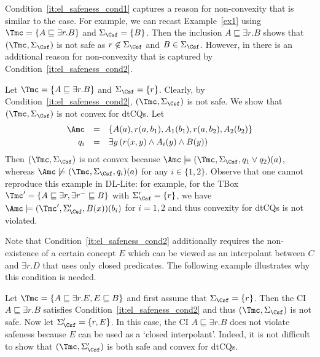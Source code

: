 \documentclass{lmcs}
\theoremstyle{definition}
\begin{document}
\smallskip
\noindent
Condition~\ref{it:el_safeness_cond1} captures a reason for
non-convexity that is similar to the \dllite case. For example,
we can recast Example~\ref{ex1} using 
%
$\Tmc = \{ A \sqsubseteq \exists r . B \}$ and
$\Sigma_\Csf = \{ B \}$. Then the inclusion
$A \sqsubseteq \exists r.B$ shows that
$(\Tmc,\Sigma_\Csf)$ is not safe as $r\not\in\Sigma_\Csf$ and
$B\in \Sigma_\Csf$. %
However, in \EL there is an additional reason for non-convexity that
is captured by Condition~\ref{it:el_safeness_cond2}. %
%
\begin{exa}\label{elex2}
Let $\Tmc = \{A \sqsubseteq \exists r.B\}$ and $\Sigma_\Csf = \{r\}$. Clearly, by 
Condition~\ref{it:el_safeness_cond2}, $(\Tmc,\Sigma_\Csf)$ is not safe.
We show that $(\Tmc,\Sigma_\Csf)$ is not convex for dtCQs. Let
 $$
  \begin{array}{rcl}
    \Amc &=&
  \{A(a),r(a,b_{1}), A_{1}(b_{1}), r(a,b_{2}),A_{2}(b_{2})\} \\[1mm]
  q_i &=& \exists y \, (r(x,y) \wedge A_i(y) \wedge B(y)) 
\end{array}
$$
% 
Then $(\Tmc,\Sigma_\Csf)$ is not convex because $\Amc\models (\Tmc,\Sigma_\Csf, q_1 \vee q_2)(a)$, whereas
$\Amc \not\models (\Tmc,\Sigma_\Csf,q_{i})(a)$ for any $i \in  \{1,2\}$. 
Observe that one cannot reproduce this example in DL-Lite: for example, for the
TBox $\Tmc'= \{A \sqsubseteq \exists r, \exists r^{-} \sqsubseteq B\}$ with $\Sigma'_\Csf=\{r\}$, 
we have $\Amc \models (\Tmc',\Sigma'_\Csf,B(x))(b_{i})$ for $i=1,2$ and thus convexity for dtCQs is not violated.
\end{exa}
Note that Condition~\ref{it:el_safeness_cond2} additionally requires
the non-existence of a certain concept $E$ which can be viewed as an
interpolant between $C$ and $\exists r.D$ that uses only closed
predicates. The following example illustrates why this condition is
needed.
\begin{exa}
  \label{ex2}
  Let $\Tmc= \{A \sqsubseteq \exists r.E,E\sqsubseteq B\}$ and first
  assume that $\Sigma_\Csf= \{r\}$. Then the CI $A\sqsubseteq
  \exists r.B$ satisfies Condition~\ref{it:el_safeness_cond2} and thus
  $(\Tmc,\Sigma_\Csf)$ is not safe.
  Now let $\Sigma'_\Csf=\{r,E\}$. In this case, the CI
  $A\sqsubseteq \exists r.B$ does not violate safeness because $E$ can
  be used as a `closed interpolant'. Indeed, it is not difficult to
  show that $(\Tmc,\Sigma'_\Csf)$ is both safe and convex for dtCQs.
\end{exa}
\end{document}
